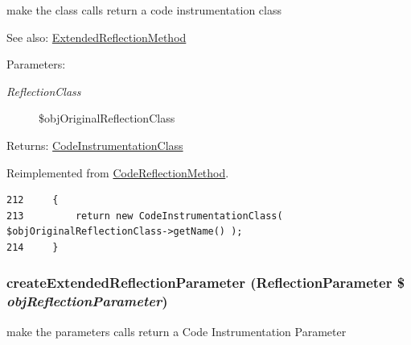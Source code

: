 make the class calls return a code instrumentation class

\begin{Desc}
\item[See also:]\hyperlink{class_extended_reflection_method}{ExtendedReflectionMethod} \end{Desc}
\begin{Desc}
\item[Parameters:]
\begin{description}
\item[{\em ReflectionClass}]\$objOriginalReflectionClass \end{description}
\end{Desc}
\begin{Desc}
\item[Returns:]\hyperlink{class_code_instrumentation_class}{CodeInstrumentationClass} \end{Desc}


Reimplemented from \hyperlink{class_code_reflection_method_6b56ec198bc6a5b5a72076e4e7c19e29}{CodeReflectionMethod}.

\begin{Code}\begin{verbatim}212     {
213         return new CodeInstrumentationClass( $objOriginalReflectionClass->getName() );
214     }
\end{verbatim}
\end{Code}


\hypertarget{class_code_instrumentation_method_98ceb248f2b535a3a83ac2e7990e0c1f}{
\subsubsection[{createExtendedReflectionParameter}]{\setlength{\rightskip}{0pt plus 5cm}createExtendedReflectionParameter (ReflectionParameter \$ {\em objReflectionParameter})}}
\label{class_code_instrumentation_method_98ceb248f2b535a3a83ac2e7990e0c1f}


make the parameters calls return a Code Instrumentation Parameter

